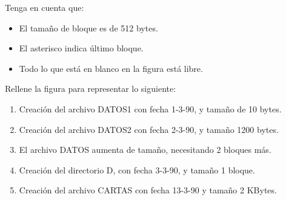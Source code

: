 \begin{ejercicio}
    Tenga en cuenta que:
    \begin{itemize}
        \item El tamaño de bloque es de 512 bytes.
        \item El asterisco indica último bloque.
        \item Todo lo que está en blanco en la figura está libre.
    \end{itemize}

    Rellene la figura para representar lo siguiente:
    \begin{enumerate}
    \item Creación del archivo DATOS1 con fecha 1-3-90, y tamaño de 10 bytes.
    \item Creación del archivo DATOS2 con fecha 2-3-90, y tamaño 1200 bytes.
    \item El archivo DATOS aumenta de tamaño, necesitando 2 bloques más.
    \item Creación del directorio D, con fecha 3-3-90, y tamaño 1 bloque.
    \item Creación del archivo CARTAS con fecha 13-3-90 y tamaño 2 KBytes.
    \end{enumerate}


\end{ejercicio}

